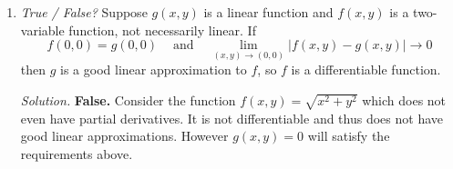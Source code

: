 \documentclass{article}
\begin{document}
\begin{enumerate}
{\em Solution.} {\bf True.} The function mentioned in section,
\[
f(x, y) = \sqrt[3]{xy}
\]
is an example of such function. The continuity follows from $f$ being the composition of a polynomial with a power function. However it is not differentiable at the origin because we cannot find $\epsilon_1$ and $\epsilon_2 \to 0$ such that
\begin{align*}
\sqrt[3]{\Delta x \Delta y} = \epsilon_1 \Delta x + \epsilon_2 \Delta y,
\end{align*}
which is the definition of differentiability because the partial derivatives at the origin are $0$.

{\em Remark.} A clearer solution can be obtained through the solutions to the solutions to Quiz 7 for Dis.\ 117.

\item {\em True / False?} Suppose $g(x, y)$ is a linear function and $f(x, y)$ is a two-variable function, not necessarily linear. If
\[
f(0, 0) = g(0, 0) ~~~~ \text{ and } ~~~~ \lim_{(x, y) \to (0, 0)} |f(x, y) - g(x, y)| \to 0
\]
then $g$ is a good linear approximation to $f$, so $f$ is a differentiable function.

{\em Solution.} {\bf False.} Consider the function $f(x, y) = \sqrt{x^2 + y^2}$ which does not even have partial derivatives. It is not differentiable and thus does not have good linear approximations. However $g(x, y) = 0$ will satisfy the requirements above.
\end{enumerate}
\end{document}
